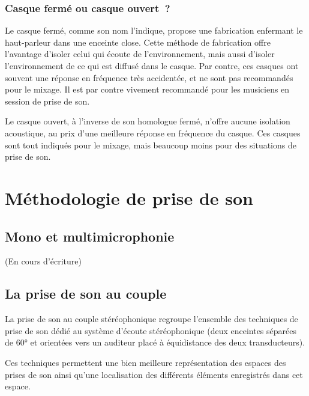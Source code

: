 \documentclass[
]{book}
\begin{document}
\hypertarget{casque-fermuxe9-ou-casque-ouvert}{%
\section{Casque fermé ou casque ouvert~?}\label{casque-fermuxe9-ou-casque-ouvert}}

Le casque fermé, comme son nom l'indique, propose une fabrication enfermant le haut-parleur dans une enceinte close. Cette méthode de fabrication offre l'avantage d'isoler celui qui écoute de l'environnement, mais aussi d'isoler l'environnement de ce qui est diffusé dans le casque. Par contre, ces casques ont souvent une réponse en fréquence très accidentée, et ne sont pas recommandés pour le mixage. Il est par contre vivement recommandé pour les musiciens en session de prise de son.

Le casque ouvert, à l'inverse de son homologue fermé, n'offre aucune isolation acoustique, au prix d'une meilleure réponse en fréquence du casque. Ces casques sont tout indiqués pour le mixage, mais beaucoup moins pour des situations de prise de son.

\hypertarget{part-muxe9thodologie-de-prise-de-son}{%
\part{Méthodologie de prise de son}\label{part-muxe9thodologie-de-prise-de-son}}

\hypertarget{mono-et-multimicrophonie}{%
\chapter{Mono et multimicrophonie}\label{mono-et-multimicrophonie}}

(En cours d'écriture)

\hypertarget{la-prise-de-son-au-couple}{%
\chapter{La prise de son au couple}\label{la-prise-de-son-au-couple}}

La prise de son au couple stéréophonique regroupe l'ensemble des techniques de prise de son dédié au système d'écoute stéréophonique (deux enceintes séparées de 60° et orientées vers un auditeur placé à équidistance des deux transducteurs).

Ces techniques permettent une bien meilleure représentation des espaces des prises de son ainsi qu'une localisation des différents éléments enregistrés dans cet espace.
\end{document}
